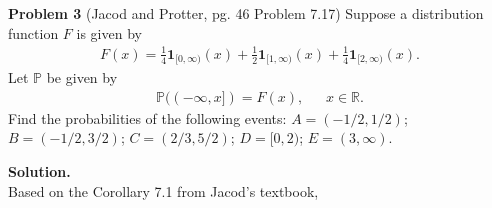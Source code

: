 \documentclass{article}
\begin{document}
\vspace{3 mm}

\noindent \textbf{Problem 3} (Jacod and Protter, pg. 46 Problem 7.17) Suppose a distribution function $F$ is given by
\begin{eqnarray*} F(x) = \frac{1}{4}\mathbf{1}_{[0, \infty)}(x) + \frac{1}{2}\mathbf{1}_{[1,\infty)}(x) + \frac{1}{4}\mathbf{1}_{[2,\infty)}(x). \end{eqnarray*}  Let $\mathbb{P}$ be given by
		\begin{eqnarray*} \mathbb{P}((-\infty, x]) = F(x), ~~~~~~~ x \in \mathbb{R}. \end{eqnarray*}  Find the probabilities of the following events:  $A = (-1/2, 1/2)$; $B = (-1/2, 3/2)$; $C = (2/3, 5/2)$; $D = [0,2)$; $E = (3,\infty)$.

\vspace{2 mm}
\noindent \textbf{Solution.}\\
Based on the Corollary 7.1 from Jacod\rq s textbook, 
\end{document}
